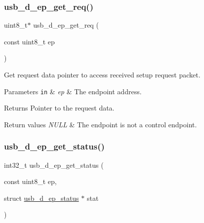 \subsubsection{\texorpdfstring{usb\+\_\+d\+\_\+ep\+\_\+get\+\_\+req()}{usb\_d\_ep\_get\_req()}}
{\footnotesize\ttfamily uint8\+\_\+t$\ast$ usb\+\_\+d\+\_\+ep\+\_\+get\+\_\+req (\begin{DoxyParamCaption}\item[{const uint8\+\_\+t}]{ep }\end{DoxyParamCaption})}



Get request data pointer to access received setup request packet. 


\begin{DoxyParams}[1]{Parameters}
\mbox{\tt in}  & {\em ep} & The endpoint address. \\
\hline
\end{DoxyParams}
\begin{DoxyReturn}{Returns}
Pointer to the request data. 
\end{DoxyReturn}

\begin{DoxyRetVals}{Return values}
{\em N\+U\+LL} & The endpoint is not a control endpoint. \\
\hline
\end{DoxyRetVals}
\mbox{\label{group__doc__driver__hal__usb__device_gaa6ccd9df460b1f5ee2c10a8203ed0543}} 
\subsubsection{\texorpdfstring{usb\+\_\+d\+\_\+ep\+\_\+get\+\_\+status()}{usb\_d\_ep\_get\_status()}}
{\footnotesize\ttfamily int32\+\_\+t usb\+\_\+d\+\_\+ep\+\_\+get\+\_\+status (\begin{DoxyParamCaption}\item[{const uint8\+\_\+t}]{ep,  }\item[{struct \hyperlink{structusb__d__ep__status}{usb\+\_\+d\+\_\+ep\+\_\+status} $\ast$}]{stat }\end{DoxyParamCaption})}



